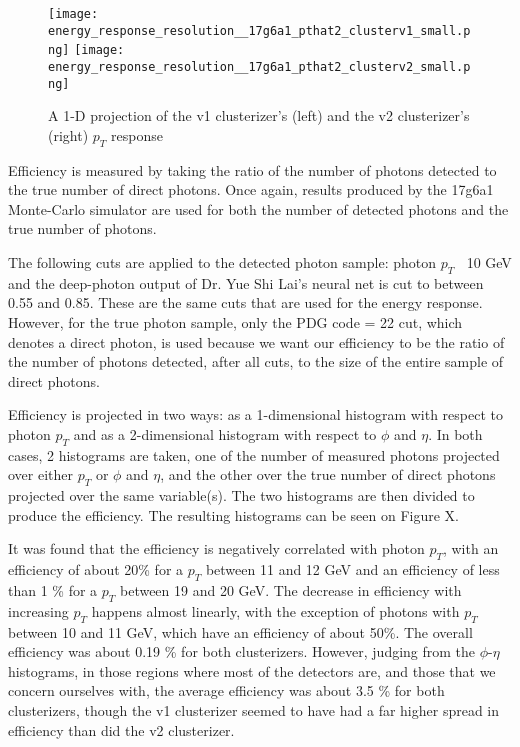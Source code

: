 \begin{figure}
\centering
\texttt{[image: energy\_response\_resolution\_\_17g6a1\_pthat2\_clusterv1\_small.png]}
\texttt{[image: energy\_response\_resolution\_\_17g6a1\_pthat2\_clusterv2\_small.png]}
\caption{A 1-D projection of the v1 clusterizer's (left) and the v2 clusterizer's (right) $p_T$ response}
\label{fig:1D_pT_response_v1_vs_v2}
\end{figure}

Efficiency is measured by taking the ratio of the number of photons detected to the true number of direct photons. Once again, results produced by the 17g6a1 Monte-Carlo simulator are used for both the number of detected photons and the true number of photons. 

The following cuts are applied to the detected photon sample: photon $p_T$ $\>$ 10 GeV and the deep-photon output of Dr. Yue Shi Lai's neural net is cut to between 0.55 and 0.85. These are the same cuts that are used for the energy response. However, for the true photon sample, only the PDG code = 22 cut, which denotes a direct photon, is used because we want our efficiency to be the ratio of the number of photons detected, after all cuts, to the size of the entire sample of direct photons.

Efficiency is projected in two ways: as a 1-dimensional histogram with respect to photon $p_T$ and as a 2-dimensional histogram with respect to $\phi$ and $\eta$. In both cases, 2 histograms are taken, one of the number of measured photons projected over either $p_T$ or $\phi$ and $\eta$, and the other over the true number of direct photons projected over the same variable(s). The two histograms are then divided to produce the efficiency. The resulting histograms can be seen on Figure X.

It was found that the efficiency is negatively correlated with photon $p_T$, with an efficiency of about 20\% for a $p_T$ between 11 and 12 GeV and an efficiency of less than 1 \% for a $p_T$ between 19 and 20 GeV. The decrease in efficiency with increasing $p_T$ happens almost linearly, with the exception of photons with $p_T$ between 10 and 11 GeV, which have an efficiency of about 50\%. The overall efficiency was about 0.19 \% for both clusterizers. However, judging from the $\phi$-$\eta$ histograms, in those regions where most of the detectors are, and those that we concern ourselves with, the average efficiency was about 3.5 \% for both clusterizers, though the v1 clusterizer seemed to have had a far higher spread in efficiency than did the v2 clusterizer.

